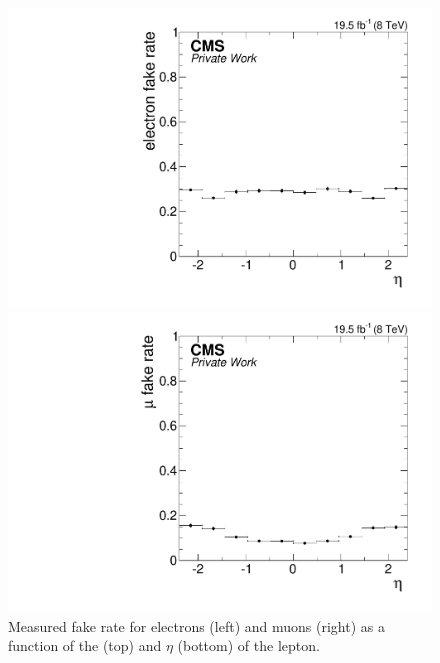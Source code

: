 \begin{figure}[tbp]
\begin{minipage}[t]{0.49\textwidth}
\includegraphics[width=\textwidth]{plots/BG/nonPrompt/fakeRate_ele_Inclusive_Full2012_TrailingEta_None.pdf}
\end{minipage}
\begin{minipage}[t]{0.49\textwidth}
\includegraphics[width=\textwidth]{plots/BG/nonPrompt/fakeRate_mu_Inclusive_Full2012_TrailingEta_None.pdf}
\end{minipage}
\caption{Measured fake rate for electrons (left) and muons (right) as a function of the \pt (top) and $\eta$ (bottom) of the lepton.}
\label{fig:fakeRate}
\end{figure} 

